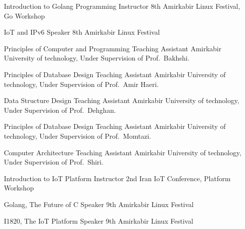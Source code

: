 \documentclass[]{friggeri-cv} %
\begin{document}
\begin{entrylist}
	{Introduction to Golang Programming}
	{Instructor}
	{8th Amirkabir Linux Festival, Go Workshop}
	

	{IoT and IPv6}
	{Speaker}
	{8th Amirkabir Linux Festival}


	{Principles of Computer and Programming}
	{Teaching Assistant}
	{Amirkabir University of technology, Under Supervision of Prof.\ Bakhshi.}


	{Principles of Database Design}
	{Teaching Assistant}
	{Amirkabir University of technology, Under Supervision of Prof.\ Amir Haeri.}

	
	{Data Structure Design}
	{Teaching Assistant}
	{Amirkabir University of technology, Under Supervision of Prof.\ Dehghan.}

	
	{Principles of Database Design}
	{Teaching Assistant}
	{Amirkabir University of technology, Under Supervision of Prof.\ Momtazi.}


	{Computer Architecture}
	{Teaching Assistant}
	{Amirkabir University of technology, Under Supervision of Prof.\ Shiri.}

	
	{Introduction to IoT Platform}
	{Instructor}
	{2nd Iran IoT Conference, Platform Workshop}


	{Golang, The Future of C}
	{Speaker}
	{9th Amirkabir Linux Festival}


	{I1820, The IoT Platform}
	{Speaker}
	{9th Amirkabir Linux Festival}



\end{entrylist}
\end{document}
